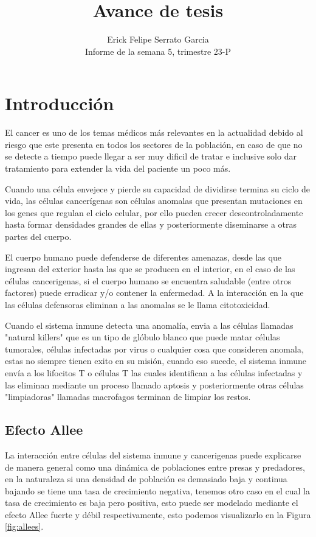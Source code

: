 \documentclass{article}
\title{Avance de tesis}
\author{Erick Felipe Serrato Garcia \\ Informe de la semana 5, trimestre 23-P}
\begin{document}
\maketitle

\section{Introducción}

El cancer es uno de los temas médicos más relevantes en la actualidad debido al riesgo que este presenta en todos los sectores de la población, en caso de que no se detecte a tiempo puede llegar a ser muy dificil de tratar e inclusive solo dar tratamiento para extender la vida del paciente un poco más.

Cuando una célula envejece y pierde su capacidad de dividirse termina su ciclo de vida, las células cancerígenas son células anomalas que presentan mutaciones en los genes que regulan el ciclo celular, por ello pueden crecer descontroladamente hasta formar densidades grandes de ellas y posteriormente diseminarse a otras partes del cuerpo.

El cuerpo humano puede defenderse de diferentes amenazas, desde las que ingresan del exterior hasta las que se producen en el interior, en el caso de las células cancerigenas, si el cuerpo humano se encuentra saludable (entre otros factores) puede erradicar y/o contener la enfermedad. A la interacción en la que las células defensoras eliminan a las anomalas se le llama citotoxicidad.

Cuando el sistema inmune detecta una anomalía, envia a las células llamadas "natural killers" que es un tipo de glóbulo blanco que puede matar células tumorales, células infectadas por virus o cualquier cosa que consideren anomala, estas no siempre tienen exito en su misión, cuando eso sucede, el sistema inmune envía a los lifocitos T o células T las cuales identifican a las células infectadas y las eliminan mediante un proceso llamado aptosis y posteriormente otras células "limpiadoras" llamadas macrofagos terminan de limpiar los restos.

\subsection{Efecto Allee}

La interacción entre células del sistema inmune y cancerigenas puede explicarse de manera general como una dinámica de poblaciones entre presas y predadores, en la naturaleza si una densidad de población es demasiado baja y continua bajando se tiene una tasa de crecimiento negativa, tenemos otro caso en el cual la tasa de crecimiento es baja pero positiva, esto puede ser modelado mediante el efecto Allee fuerte y débil respectivamente, esto podemos visualizarlo en la Figura \ref{fig:allees}.
\end{document}
